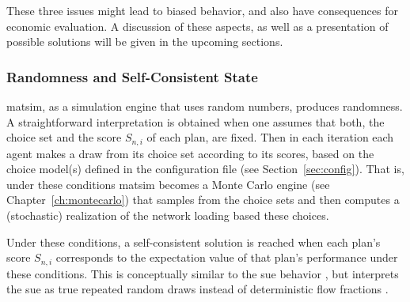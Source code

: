 %
These three issues might lead to biased behavior, and also have consequences for economic evaluation. A discussion of these aspects, as well as a presentation of possible solutions will be given in the upcoming sections.


\subsubsection{Randomness and Self-Consistent State}
\label{ch:economicEval:describingBehavior:discreteChoice:quenchedVsAnnealed}
%
%


\acrshort{matsim}, as a simulation engine that uses random numbers, produces randomness.
%
A straightforward interpretation is obtained when one assumes that both, the choice set and the score $S_{n,i}$ of each plan, 
%
%
are fixed. Then in each iteration each agent makes a draw from its choice set according to its scores, based on the choice model(s) defined in the configuration file (see Section~\ref{sec:config}).
%
%
%
That is, under these conditions \acrshort{matsim} becomes a Monte Carlo engine
%
(see Chapter~\ref{ch:montecarlo})
%
%
%
that samples from the choice sets and then computes a (stochastic) realization of the network loading based these choices.

Under these conditions, a self-consistent solution is reached when each plan's score $S_{n,i}$ corresponds to the expectation value of that plan's performance under these conditions.
%
%
%
This is conceptually similar to the \gls{sue} behavior \citep{DaganzoSheffi_TransScience_1977}, but interprets the \gls{sue} as true repeated random draws instead of deterministic flow fractions \citep{NagelFloetteroed2009IatbrResourceInBook}.

